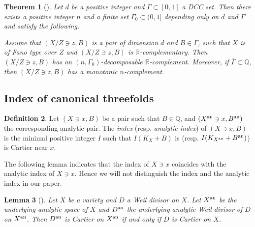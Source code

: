 \documentclass[11pt]{amsart}
\numberwithin{equation}{section}
\newcommand{\Qq}{\mathbb{Q}}
\newcommand{\Rr}{\mathbb{R}}
\newcommand{\Ii}{{\Gamma}}
\newtheorem{thm}{Theorem}[section]
\newtheorem{lem}[thm]{Lemma}
\theoremstyle{definition}
\theoremstyle{definition}
\newtheorem{defn}[thm]{Definition}
\begin{document}
\begin{thm}[{\cite[Theorem 1.10]{HLS19}}]\label{thm: ni decomposable complement}
Let $d$ be a positive integer and $\Ii\subset [0,1]$ a DCC set. Then there exists a positive integer $n$ and a finite set $\Ii_0\subset (0,1]$ depending only on $d$ and $\Ii$ and satisfy the following. 

Assume that $(X/Z\ni z,B)$ is a pair of dimension $d$ and $B\in\Ii$, such that $X$ is of Fano type over $Z$ and $(X/Z\ni z,B)$ is $\Rr$-complementary. Then $(X/Z\ni z,B)$ has an $(n,\Ii_0)$-decomposable $\Rr$-complement. Moreover, if $\bar\Ii\subset\Qq$, then $(X/Z\ni z,B)$ has a monotonic $n$-complement.
\end{thm}

\subsection{Index of canonical threefolds}

\begin{defn}\label{def: definition of index}
Let $(X\ni x,B)$ be a pair such that $B\in\Qq$, and $(X^{\rm an}\ni x,B^{\rm an})$ the corresponding analytic pair. The \emph{index} (resp. \emph{analytic index}) of $(X\ni x,B)$ is the minimal positive integer $I$ such that $I(K_X+B)$ is  (resp. $I(K_{X^{\rm an}}+B^{\rm an})$) is Cartier near $x$. 
\end{defn}

The following lemma indicates that the index of $X\ni x$ coincides with the analytic index of $X\ni x$. Hence we will not distinguish the index and the analytic index in our paper.

\begin{lem}[{\cite[Lemma~1.10]{Kaw88}}]\label{lem: analytic index and algebraic index}
Let $X$ be a variety and $D$ a Weil divisor on $X$. Let $X^{\rm an}$ be the underlying analytic space of $X$ and $D^{\rm an}$ the underlying analytic Weil divisor of $D$ on $X^{\rm an}$. Then $D^{\rm an}$ is Cartier on $X^{\rm an}$ if and only if $D$ is Cartier on $X$.
\end{lem}

\end{document}

